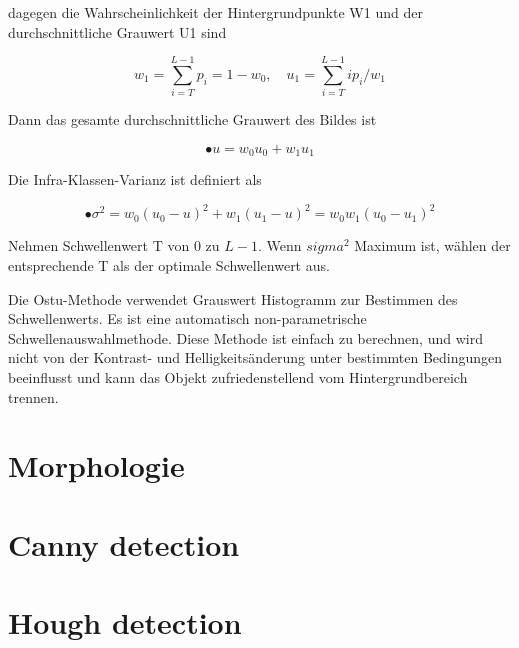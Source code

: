 dagegen die Wahrscheinlichkeit der Hintergrundpunkte W1 und der durchschnittliche Grauwert U1 sind

\begin{equation}
  w_{1} = \sum_{i=T}^{L-1} p_{i} = 1-w_{0},\quad u_{1} = \sum_{i=T}^{L-1} ip_{i}/w_{1}
\end{equation}

Dann das gesamte durchschnittliche Grauwert des Bildes ist

\begin{equation}
• u = w_{0}u_{0} + w_{1}u_{1}
\end{equation}

Die Infra-Klassen-Varianz ist definiert als

\begin{equation}
•\sigma^2 = w_{0}(u_{0} - u)^2 + w_{1}(u_{1} - u)^2 = w_{0}w_{1}(u_{0} - u_{1})^2
\end{equation}

Nehmen Schwellenwert T von 0 zu $ L-1 $. Wenn $ sigma^2 $ Maximum ist, wählen der entsprechende T als der optimale Schwellenwert aus.

Die Ostu-Methode verwendet Grauswert Histogramm zur Bestimmen des Schwellenwerts. Es ist eine automatisch non-parametrische Schwellenauswahlmethode. Diese Methode ist einfach zu berechnen, und wird nicht von der Kontrast- und Helligkeitsänderung unter bestimmten Bedingungen beeinflusst und kann das Objekt zufriedenstellend vom Hintergrundbereich trennen.

















\section{Morphologie}



\section{Canny detection}



\section{Hough detection}


